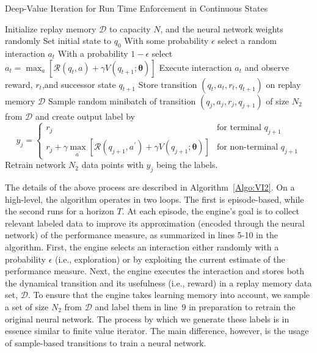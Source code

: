 \begin{algorithm}[h!]
\caption{Deep-Value Iteration for Run Time Enforcement in Continuous States}
\label{Algo:VI2}
\begin{algorithmic}[1]
\STATE Initialize replay memory $\mathcal{D}$ to capacity $N$, and the neural network weights randomly 
\STATE Set initial state to $q_{0}$
\STATE With some probability $\epsilon$ select a random interaction $a_{t}$
\STATE With a probability $1 - \epsilon$ select $a_{t} = \max_{a} \left[\mathcal{R}(q_{t}, a) + \gamma V(q_{t+1};\bm{\theta})\right]$
\STATE Execute interaction $a_{t}$ and observe reward, $r_{t}$,and successor state $q_{t+1}$
\STATE Store transition $\left(q_{t}, a_{t}, r_{t}, q_{t+1}\right)$ on replay memory $\mathcal{D}$
\STATE Sample random minibatch of transition $\left(q_{j}, a_{j}, r_{j}, q_{j+1}\right)$ of size $N_{2}$ from $\mathcal{D}$ and create output label by 
\begin{displaymath}
   y_{j} = \left\{
     \begin{array}{lr}
       r_{j} & \text{for terminal $q_{j+1}$}\\
        r_{j} + \gamma \max_{a^{\prime}}\left[\mathcal{R}(q_{j+1}, a^{\prime}) + \gamma V(q_{j+1};\bm{\theta})\right]  & \text{for non-terminal $q_{j+1}$}
     \end{array}
   \right.
\end{displaymath} 
\ENDFOR
\STATE Retrain network $N_{2}$ data points with $y_{j}$ being the labels. 
\ENDFOR
\end{algorithmic}
\end{algorithm}
The details of the above process are described in Algorithm~\ref{Algo:VI2}. On a high-level, the algorithm operates in two loops. The first is episode-based, while the second runs for a horizon $T$. At each episode, the engine's goal is to collect relevant labeled data to improve its approximation (encoded through the neural network) of the performance measure, as summarized in lines 5-10 in the algorithm. First, the engine selects an interaction either randomly with a probability $\epsilon$ (i.e., exploration) or by exploiting the current estimate of the performance measure. Next, the engine executes the interaction and stores both the dynamical transition and its usefulness (i.e., reward) in a replay memory data set, $\mathcal{D}$. To ensure that the engine takes learning memory into account, we sample a set of size $N_{2}$ from $\mathcal{D}$ and label them in line~9  in preparation to retrain the original neural network. The process by which we generate these labels is in essence similar to finite value iterator. The main difference, however, is the usage of sample-based transitions to train a neural network.  






